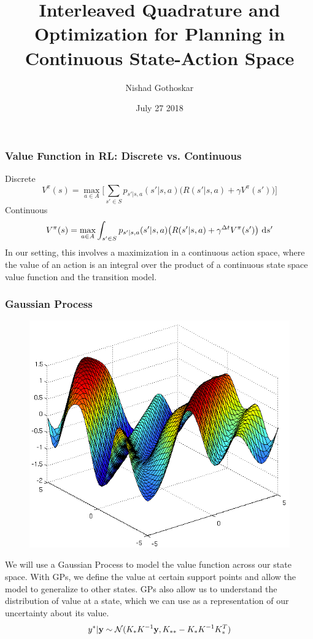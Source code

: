 \documentclass[10pt]{beamer}
\title{Interleaved Quadrature and Optimization for Planning in Continuous State-Action Space}
\author{Nishad Gothoskar}
\institute{LIS}
\date{July 27 2018}
\begin{document}
 
\frame{\titlepage}
 
\begin{frame}
\frametitle{Value Function in RL: Discrete vs. Continuous}
Discrete
\begin{equation*}    %
        V^{\pi}(s) = \max_{a \in A} \Big[\sum_{s' \in S} p_{s'|s,a}(s'|s,a)\big(R(s'|s,a) + \gamma V^{\pi}(s')\big) \Big]
\end{equation*}
Continuous
\begin{equation*}    %
        V^{\pi}(s) = \max_{a \in A} \int_{s' \in S} p_{s'|s,a}(s'|s,a)\big(R(s'|s,a) + \gamma^{\Delta t}V^{\pi}(s')\big) \ \textup{d}s'
\end{equation*}
\newline
In our setting, this involves a maximization in a continuous action space, where the value of an action is an integral over the product of a continuous state space value function and the transition model. 
\end{frame}

\begin{frame}
\frametitle{Gaussian Process}
\begin{figure}
\includegraphics[scale=0.2]{gp}
\end{figure}
We will use a Gaussian Process to model the value function across our state space. With GPs, we define the value at certain support points and allow the model to generalize to other states. 
\newline  \newline
GPs also allow us to understand the distribution of value at a state, which we can use as a representation of our uncertainty about its value.
\begin{equation*}    %
	y^{*}|\bold{y} \sim \mathcal{N}(K_{*}K^{-1}\bold{y}, K_{**} - K_{*}K^{-1}K_{*}^{T})
\end{equation*}
\end{frame}
\end{document}

